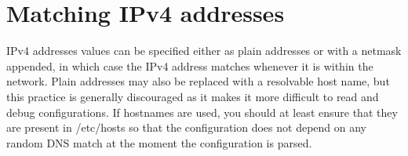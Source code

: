 
\section{Matching IPv4 addresses}

IPv4 addresses values can be specified either as plain addresses or with a
netmask appended, in which case the IPv4 address matches whenever it is
within the network. Plain addresses may also be replaced with a resolvable
host name, but this practice is generally discouraged as it makes it more
difficult to read and debug configurations. If hostnames are used, you should
at least ensure that they are present in /etc/hosts so that the configuration
does not depend on any random DNS match at the moment the configuration is
parsed.

